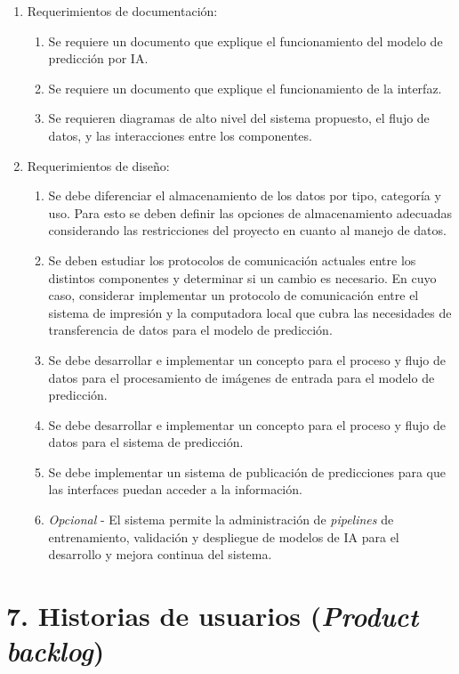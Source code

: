 \documentclass[
11pt, %
]{charter}
\begin{document}
\begin{enumerate}
\begin{enumerate}
        \end{enumerate}
	\item Requerimientos de documentación:
		\begin{enumerate}
			\item Se requiere un documento que explique el funcionamiento del modelo de predicción por IA.
			\item Se requiere un documento que explique el funcionamiento de la interfaz.
            \item Se requieren diagramas de alto nivel del sistema propuesto, el flujo de datos, y las interacciones entre los componentes.
		\end{enumerate}
	\item Requerimientos de diseño:
    	\begin{enumerate}
			\item Se debe diferenciar el almacenamiento de los datos por tipo, categoría y uso. Para esto se deben definir las opciones de almacenamiento adecuadas considerando las restricciones del proyecto en cuanto al manejo de datos.
            \item Se deben estudiar los protocolos de comunicación actuales entre los distintos componentes y determinar si un cambio es necesario. En cuyo caso, considerar implementar un protocolo de comunicación entre el sistema de impresión y la computadora local que cubra las necesidades de transferencia de datos para el modelo de predicción. 
            \item Se debe desarrollar e implementar un concepto para el proceso y flujo de datos para el procesamiento de imágenes de entrada para el modelo de predicción.
            \item Se debe desarrollar e implementar un concepto para el proceso y flujo de datos para el sistema de predicción.
            \item Se debe implementar un sistema de publicación de predicciones para que las interfaces puedan acceder a la información.
			\item \textit{Opcional} - El sistema permite la administración de \textit{pipelines} de entrenamiento, validación y despliegue de modelos de IA para el desarrollo y mejora continua del sistema.
		\end{enumerate}
\end{enumerate}

\section{7. Historias de usuarios (\textit{Product backlog})}
\label{sec:backlog}
\end{document}
